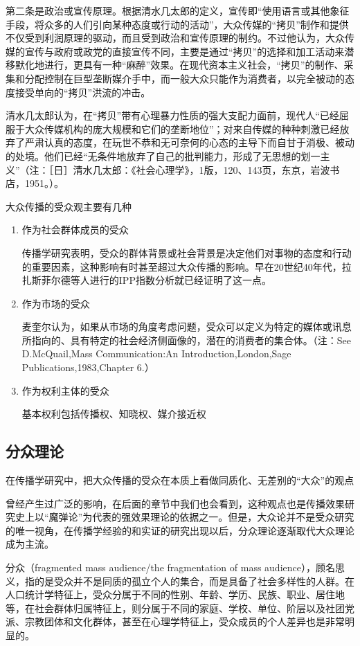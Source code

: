 \documentclass[UTF8,12pt]{ctexart}
\numberwithin{equation}{section} %
\numberwithin{figure}{section}
\numberwithin{table}{section}
\begin{document}
	第二条是政治或宣传原理。根据清水几太郎的定义，宣传即“使用语言或其他象征手段，将众多的人们引向某种态度或行动的活动”，大众传媒的“拷贝”制作和提供不仅受到利润原理的驱动，而且受到政治和宣传原理的制约。不过他认为，大众传媒的宣传与政府或政党的直接宣传不同，主要是通过“拷贝”的选择和加工活动来潜移默化地进行，更具有一种“麻醉”效果。在现代资本主义社会，“拷贝”的制作、采集和分配控制在巨型垄断媒介手中，而一般大众只能作为消费者，以完全被动的态度接受单向的“拷贝”洪流的冲击。
	
	清水几太郎认为，在“拷贝”带有心理暴力性质的强大支配力面前，现代人“已经屈服于大众传媒机构的庞大规模和它们的垄断地位”；对来自传媒的种种刺激已经放弃了严肃认真的态度，在玩世不恭和无可奈何的心态的主导下而自甘于消极、被动的处境。他们已经“无条件地放弃了自己的批判能力，形成了无思想的划一主义”（注：［日］清水几太郎：《社会心理学》，1版，120、143页，东京，岩波书店，1951。）。
	
	大众传播的受众观主要有几种
	\begin{enumerate}
		\item 作为社会群体成员的受众
		
		传播学研究表明，受众的群体背景或社会背景是决定他们对事物的态度和行动的重要因素，这种影响有时甚至超过大众传播的影响。早在20世纪40年代，拉扎斯菲尔德等人进行的IPP指数分析就已经证明了这一点。
		
		\item 作为市场的受众
		
		麦奎尔认为，如果从市场的角度考虑问题，受众可以定义为特定的媒体或讯息所指向的、具有特定的社会经济侧面像的，潜在的消费者的集合体。（注：See D.McQuail,Mass Communication:An Introduction,London,Sage Publications,1983,Chapter 6.）
		
		\item 作为权利主体的受众
		
		基本权利包括传播权、知晓权、媒介接近权
	\end{enumerate}
	
	
	\subsection{分众理论}
	在传播学研究中，把大众传播的受众在本质上看做同质化、无差别的“大众”的观点
	
	曾经产生过广泛的影响，在后面的章节中我们也会看到，这种观点也是传播效果研究史上以“魔弹论”为代表的强效果理论的依据之一。但是，大众论并不是受众研究的唯一视角，在传播学经验的和实证的研究出现以后，分众理论逐渐取代大众理论成为主流。
	
	分众（fragmented mass audience/the fragmentation of mass audience），顾名思义，指的是受众并不是同质的孤立个人的集合，而是具备了社会多样性的人群。在人口统计学特征上，受众分属于不同的性别、年龄、学历、民族、职业、居住地等，在社会群体归属特征上，则分属于不同的家庭、学校、单位、阶层以及社团党派、宗教团体和文化群体，甚至在心理学特征上，受众成员的个人差异也是非常明显的。
	
\end{document}
